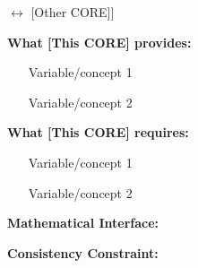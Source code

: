 %
%

\begin{tcolorbox}[colback=blue!5!white, colframe=blue!75!black, 
    title=CORE Integration Template: [This CORE] $\leftrightarrow$ [Other CORE]]

\textbf{What [This CORE] provides:}
\begin{itemize}[nosep]
\item [Variable/concept 1]
\item [Variable/concept 2]
\end{itemize}

\textbf{What [This CORE] requires:}
\begin{itemize}[nosep]
\item [Variable/concept 1]
\item [Variable/concept 2]
\end{itemize}

\textbf{Mathematical Interface:}
\begin{equation}
[Equation showing how variables connect]
\end{equation}

\textbf{Consistency Constraint:}
\begin{equation}
[Constraint that must hold for consistency]
\end{equation}

\end{tcolorbox}


%


